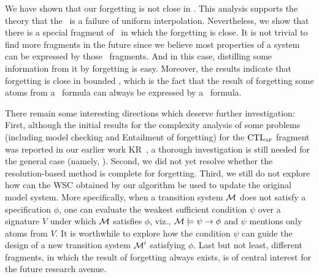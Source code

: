\documentclass[twoside,11pt]{article}
\begin{document}
	We have shown that our forgetting is not close in \CTL. This analysis supports the theory that the \CTL\ is a failure of uniform interpolation. Nevertheless, we show that there is a special fragment of \CTL\ in which the forgetting is close. It is not trivial to find more fragments in the future since we believe most properties of a system can be expressed by those \CTL\ fragments. And in this case, distilling some information from it by forgetting is easy. Moreover, the results indicate that forgetting is close in bounded \CTL, which is the fact that the result of forgetting some atoms from a \CTL\ formula can always be expressed by a \CTL\ formula.
	
	There remain some interesting directions which deserve further investigation: First, although the initial results for the  complexity analysis of some problems (including model checking and  Entailment of forgetting) for the $\textrm{CTL}_{\textsc{a}\textsc{f}}$ fragment was reported in our earlier work  KR~\cite{renyansfirstpaper}, a thorough investigation is still needed for the general case (namely, \CTL). Second, we did not yet resolve whether the resolution-based method is complete for forgetting. Third, we still do not explore how can the WSC obtained by our algorithm be used to update the original model system.
	More specifically, when a transition system $\cal M$ does not satisfy a specification $\phi$, one can evaluate the weakest sufficient condition  $\psi$ over a signature $V$ under which ${\cal M}$ satisfies $\phi$, viz., ${\cal M}\models\psi\rightarrow \phi$ and $\psi$ mentions only atoms from $V$. It is worthwhile to explore how the condition $\psi$ can guide the design of a new transition system ${\cal M}'$ satisfying $\phi$.
	Last but not least, different fragments, in which the result of forgetting always exists, is of central interest for the future research avenue.
	
	
	
	
	
	
\end{document}

